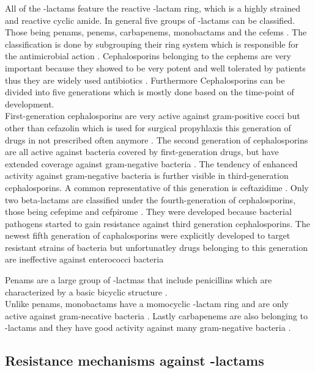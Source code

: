 All of the \textbeta-lactams feature the reactive \textbeta-lactam ring, which is a highly strained and reactive cyclic amide. In general five groups of \textbeta-lactams can be classified. Those being penams, penems, carbapenems, monobactams and the cefems \cite{beta-lactam_nodate}. The classification is done by subgrouping their ring system which is responsible for the antimicrobial action \cite{fernandes_-lactams:_2013}. 
Cephalosporins belonging to the cephems are very important because they showed to be very potent and well tolerated by patients thus they are widely used antibiotics \cite{dancer_problem_2001}. Furthermore Cephalosporins can be divided into five generations which is mostly done based on the time-point of development. \\
First-generation cephalosporins are very active against gram-positive cocci but other than cefazolin which is used for surgical propyhlaxis this generation of drugs in not prescribed often anymore \cite{fernandes_-lactams:_2013}. The second generation of cephalosporins are all active against bacteria covered by first-generation drugs, but have extended coverage against gram-negative bacteria \cite{fernandes_-lactams:_2013}. The tendency of enhanced activity against gram-negative bacteria is further visible in third-generation cephalosporins. A common representative of this generation is ceftazidime \cite{klein_third-generation_1995}. Only two beta-lactams are classified under the fourth-generation of cephalosporins, those being cefepime and cefpirome \cite{fernandes_-lactams:_2013}. They were developed because bacterial pathogens started to gain resistance against third generation cephalosporins. 
The newest fifth generation of caphalosporins were explicitly developed to target resistant strains of bacteria but unfortunatley drugs belonging to this generation are ineffective against enterococci bacteria \cite{fernandes_-lactams:_2013} 

Penams are a large group of \textbeta-lactmas that include penicillins which are characterized by a basic bicyclic structure \cite{beta-lactam_nodate}. \\
Unlike penams, monobactams have a momocyclic \textbeta-lactam ring and are only active against gram-necative bacteria \cite{fernandes_-lactams:_2013}. Lastly carbapenems are also belonging to \textbeta-lactams and they have good activity against many gram-negative bacteria \cite{beta-lactam_nodate}.  

\subsection{Resistance mechanisms against \textbeta-lactams}


